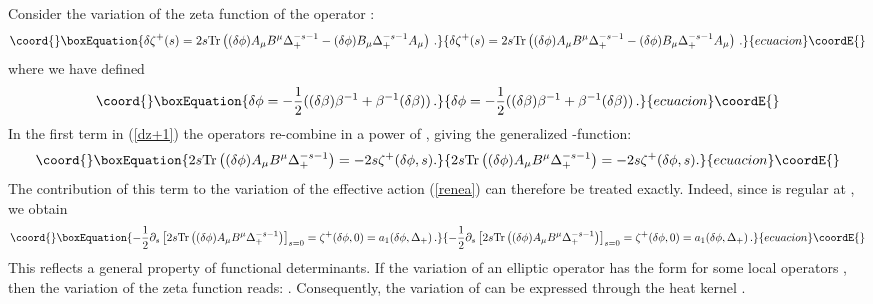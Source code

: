 \documentclass[a4paper,12pt]{article}
\begin{document}
Consider the variation of the zeta function \myHighlight{$\zeta^+$}\coordHE{} of
the operator \myHighlight{$\Delta_+$}\coordHE{}:
\begin{equation}\coord{}\boxEquation{
\delta \zeta^+(s)= 2s {\rm Tr} \left( (\delta \phi )
A_\mu B^\mu \Delta_+^{-s-1}
-(\delta \phi ) B_\mu \Delta_+^{-s-1} A_\mu \right)\,.
\label{dz+1}
}{
\delta \zeta^+(s)= 2s {\rm Tr} \left( (\delta \phi )
A_\mu B^\mu \Delta_+^{-s-1}
-(\delta \phi ) B_\mu \Delta_+^{-s-1} A_\mu \right)\,.
}{ecuacion}\coordE{}\end{equation}
where we have defined
\begin{equation}\coord{}\boxEquation{
\delta\phi =-\frac 12 ((\delta\beta)\beta^{-1} +
\beta^{-1}(\delta\beta))\,. \label{6dphi}
}{
\delta\phi =-\frac 12 ((\delta\beta)\beta^{-1} +
\beta^{-1}(\delta\beta))\,. }{ecuacion}\coordE{}\end{equation}
In the first term in (\ref{dz+1}) the operators re-combine
in a power of \myHighlight{$\Delta_+$}\coordHE{}, giving the generalized \myHighlight{$\zeta$}\coordHE{}-function:
\begin{equation}\coord{}\boxEquation{
  2s {\rm Tr} \left( (\delta \phi )
A_\mu B^\mu \Delta_+^{-s-1} \right)=
-2s \zeta^+ (\delta \phi ,s) . 
\label{1stterm}
}{
  2s {\rm Tr} \left( (\delta \phi )
A_\mu B^\mu \Delta_+^{-s-1} \right)=
-2s \zeta^+ (\delta \phi ,s) . 
}{ecuacion}\coordE{}\end{equation}
The contribution of this term to the variation of the effective
action (\ref{renea})
can therefore be treated exactly. Indeed, since \coordHE{}
is regular at \coordHE{}, we obtain
\begin{equation}\coord{}\boxEquation{
-\frac 12 \partial_s \left[ 2s {\rm Tr} \left( (\delta \phi )
A_\mu B^\mu \Delta_+^{-s-1} \right)\right]_{s=0}=
\zeta^+ (\delta \phi ,0)=a_1(\delta\phi ,\Delta_+ )\,.
\label{1stterm2}
}{
-\frac 12 \partial_s \left[ 2s {\rm Tr} \left( (\delta \phi )
A_\mu B^\mu \Delta_+^{-s-1} \right)\right]_{s=0}=
\zeta^+ (\delta \phi ,0)=a_1(\delta\phi ,\Delta_+ )\,.
}{ecuacion}\coordE{}\end{equation}
This reflects a general property of functional determinants.
If the variation of an elliptic operator \coordHE{} has the form
\coordHE{} for
some local operators \coordHE{}, then the variation of 
the zeta function reads: 
\coordHE{}.
Consequently, the variation of \coordHE{} can be expressed
through the heat kernel 
\coordHE{}.
\end{document}
